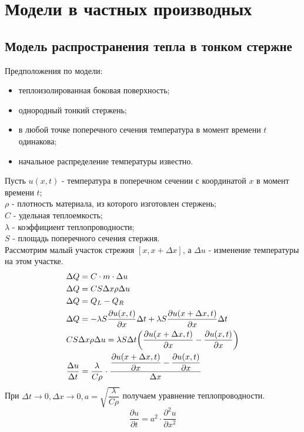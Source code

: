 \section{Модели в частных производных}
\subsection{Модель распространения тепла в тонком стержне}
Предположения по модели:
\begin{itemize}
  \item теплоизолированная боковая поверхность;
  \item однородный тонкий стержень;
  \item в любой точке поперечного сечения температура в момент времени $t$ одинакова;
  \item начальное распределение температуры известно.
\end{itemize}
Пусть $u(x,t)$ - температура в поперечном сечении с координатой $x$ в момент времени $t$;\\
$\rho$ - плотность материала, из которого изготовлен стержень;\\
$C$ - удельная теплоемкость;\\
$\lambda$ - коэффициент теплопроводности;\\
$S$ - площадь поперечного сечения стержня.\\
Рассмотрим малый участок стрежня $[x,x+\Delta x]$, а $\Delta u$ - изменение температуры на этом участке.
\begin{align}
  &\Delta Q=C\cdot m \cdot \Delta u\notag\\
  &\Delta Q=CS\Delta x\rho\Delta u\notag\\
  &\Delta Q = Q_L-Q_R\notag\\
  &\Delta Q = -\lambda S\dfrac{\partial u(x,t)}{\partial x}\Delta t+\lambda S\dfrac{\partial u(x+\Delta x,t)}{\partial x}\Delta t\\
  &CS\Delta x\rho\Delta u=\lambda S\Delta t\bigg(\dfrac{\partial u(x+\Delta x,t)}{\partial x}-\dfrac{\partial u(x,t)}{\partial x} \bigg)\notag\\
  &\dfrac{\Delta u}{\Delta t}=\dfrac{\lambda}{C\rho}\cdot \dfrac{\dfrac{\partial u(x+\Delta x,t)}{\partial x}-\dfrac{\partial u(x,t)}{\partial x}}{\Delta x}\notag
\end{align}
При $ \Delta t\to 0, \Delta x\to 0,a=\sqrt{\dfrac{\lambda}{C\rho}}$ получаем уравнение теплопроводности.
\begin{equation}
  \dfrac{\partial u}{\partial t}=a^2\cdot\dfrac{\partial^2 u}{\partial x^2}
\end{equation}
